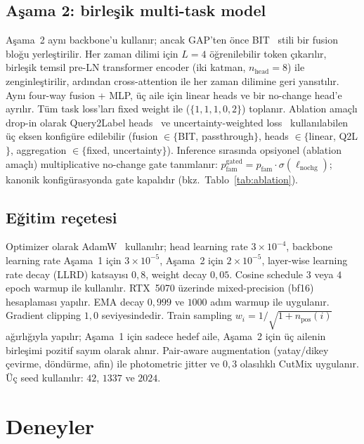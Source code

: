 \documentclass[conference]{IEEEtran}
\begin{document}
\subsection{Aşama 2: birleşik multi-task model}

Aşama~2 aynı backbone'u kullanır; ancak GAP'ten önce BIT~\cite{chen2022bit} stili bir fusion bloğu yerleştirilir. Her zaman dilimi için $L{=}4$ öğrenilebilir token çıkarılır, birleşik temsil pre-LN transformer encoder (iki katman, $n_\text{head}{=}8$) ile zenginleştirilir, ardından cross-attention ile her zaman dilimine geri yansıtılır. Aynı four-way fusion + MLP, üç aile için linear heads ve bir no-change head'e ayrılır. Tüm task loss'ları fixed weight ile ($\{1, 1, 1, 0{,}2\}$) toplanır. Ablation amaçlı drop-in olarak Query2Label heads~\cite{liu2021q2l} ve uncertainty-weighted loss~\cite{kendall2018uwl} kullanılabilen üç eksen konfigüre edilebilir (fusion $\in\{$BIT, passthrough$\}$, heads $\in\{$linear, Q2L$\}$, aggregation $\in\{$fixed, uncertainty$\}$). Inference sırasında opsiyonel (ablation amaçlı) multiplicative no-change gate tanımlanır: $p^{\text{gated}}_{\text{fam}} = p_{\text{fam}} \cdot \sigma(\ell_{\text{nochg}})$; kanonik konfigürasyonda gate kapalıdır (bkz.\ Tablo~\ref{tab:ablation}).



\subsection{Eğitim reçetesi}
Optimizer olarak AdamW~\cite{loshchilov2019adamw} kullanılır; head learning rate $3{\times}10^{-4}$, backbone learning rate Aşama~1 için $3{\times}10^{-5}$, Aşama~2 için $2{\times}10^{-5}$, layer-wise learning rate decay (LLRD) katsayısı $0{,}8$, weight decay $0{,}05$. Cosine schedule $3$ veya $4$ epoch warmup ile kullanılır. RTX~5070 üzerinde mixed-precision (bf16) hesaplaması yapılır. EMA decay $0{,}999$ ve $1000$ adım warmup ile uygulanır. Gradient clipping $1{,}0$ seviyesindedir. Train sampling $w_i = 1/\sqrt{1 + n_\text{pos}(i)}$ ağırlığıyla yapılır; Aşama~1 için sadece hedef aile, Aşama~2 için üç ailenin birleşimi pozitif sayım olarak alınır. Pair-aware augmentation (yatay/dikey çevirme, döndürme, afin) ile photometric jitter ve $0{,}3$ olasılıklı CutMix uygulanır. Üç seed kullanılır: $42$, $1337$ ve $2024$.

\section{Deneyler}
\end{document}
